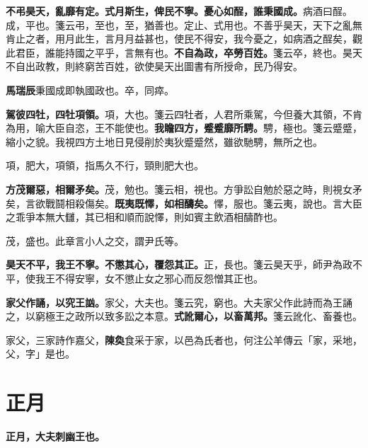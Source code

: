 \textbf{不弔昊天，亂靡有定。式月斯生，俾民不寧。憂心如酲，誰秉國成。}{\footnotesize 病酒曰酲。成，平也。箋云弔，至也，至，猶善也。定止、式用也。不善乎昊天，天下之亂無肯止之者，用月此生，言月月益甚也，使民不得安，我今憂之，如病酒之酲矣，觀此君臣，誰能持國之平乎，言無有也。}\textbf{不自為政，卒勞百姓。}{\footnotesize 箋云卒，終也。昊天不自出政教，則終窮苦百姓，欲使昊天出圖書有所授命，民乃得安。}

\begin{quoting}\textbf{馬瑞辰}秉國成即執國政也。卒，同瘁。\end{quoting}

\textbf{駕彼四牡，四牡項領。}{\footnotesize 項，大也。箋云四牡者，人君所乘駕，今但養大其領，不肯為用，喻大臣自恣，王不能使也。}\textbf{我瞻四方，蹙蹙靡所騁。}{\footnotesize 騁，極也。箋云蹙蹙，縮小之貌。我視四方土地日見侵削於夷狄蹙蹙然，雖欲馳騁，無所之也。}

\begin{quoting}項，肥大，項領，指馬久不行，頸則肥大也。\end{quoting}

\textbf{方茂爾惡，相爾矛矣。}{\footnotesize 茂，勉也。箋云相，視也。方爭訟自勉於惡之時，則視女矛矣，言欲戰鬪相殺傷矣。}\textbf{既夷既懌，如相醻矣。}{\footnotesize 懌，服也。箋云夷，說也。言大臣之乖爭本無大讎，其已相和順而說懌，則如賓主飲酒相醻酢也。}

\begin{quoting}茂，盛也。此章言小人之交，謂尹氏等。\end{quoting}

\textbf{昊天不平，我王不寧。不懲其心，覆怨其正。}{\footnotesize 正，長也。箋云昊天乎，師尹為政不平，使我王不得安寧，女不懲止女之邪心而反怨憎其正也。}

\textbf{家父作誦，以究王訩。}{\footnotesize 家父，大夫也。箋云究，窮也。大夫家父作此詩而為王誦之，以窮極王之政所以致多訟之本意。}\textbf{式訛爾心，以畜萬邦。}{\footnotesize 箋云訛化、畜養也。}

\begin{quoting}家父，三家詩作嘉父，\textbf{陳奐}食采于家，以邑為氏者也，何注公羊傳云「家，采地，父，字」是也。\end{quoting}

\section{正月}


\textbf{正月，大夫刺幽王也。}

